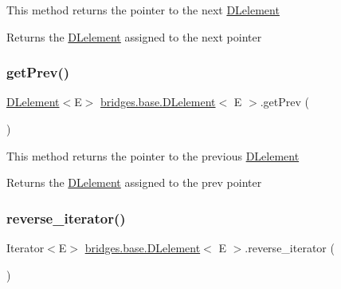 This method returns the pointer to the next \hyperlink{classbridges_1_1base_1_1_d_lelement}{D\+Lelement}

\begin{DoxyReturn}{Returns}
the \hyperlink{classbridges_1_1base_1_1_d_lelement}{D\+Lelement} assigned to the next pointer 
\end{DoxyReturn}
\mbox{\label{classbridges_1_1base_1_1_d_lelement_a859f08f38513ecdfff0eb11bd2b98ce7}} 
\subsubsection{\texorpdfstring{get\+Prev()}{getPrev()}}
{\footnotesize\ttfamily \hyperlink{classbridges_1_1base_1_1_d_lelement}{D\+Lelement}$<$E$>$ \hyperlink{classbridges_1_1base_1_1_d_lelement}{bridges.\+base.\+D\+Lelement}$<$ E $>$.get\+Prev (\begin{DoxyParamCaption}{ }\end{DoxyParamCaption})}

This method returns the pointer to the previous \hyperlink{classbridges_1_1base_1_1_d_lelement}{D\+Lelement}

\begin{DoxyReturn}{Returns}
the \hyperlink{classbridges_1_1base_1_1_d_lelement}{D\+Lelement} assigned to the prev pointer 
\end{DoxyReturn}
\mbox{\label{classbridges_1_1base_1_1_d_lelement_aaa90db2862f43b5ef07face87fcd8588}} 
\subsubsection{\texorpdfstring{reverse\+\_\+iterator()}{reverse\_iterator()}}
{\footnotesize\ttfamily Iterator$<$E$>$ \hyperlink{classbridges_1_1base_1_1_d_lelement}{bridges.\+base.\+D\+Lelement}$<$ E $>$.reverse\+\_\+iterator (\begin{DoxyParamCaption}{ }\end{DoxyParamCaption})}

